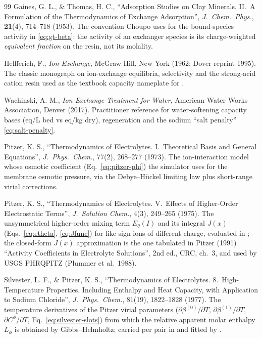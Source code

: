 \documentclass[11pt,a4paper]{article}
\begin{document}
\begin{thebibliography}{99}
 Gaines, G. L., \& Thomas, H. C., ``Adsorption Studies on Clay Minerals. II.\ A Formulation of the Thermodynamics of Exchange Adsorption'', \emph{J.\ Chem.\ Phys.}, \textbf{21}(4), 714--718 (1953). The convention Choupo uses for the bound-species activity in \eqref{eq:gt-beta}: the activity of an exchanger species is its charge-weighted \emph{equivalent fraction} on the resin, not its molality.

 Helfferich, F., \emph{Ion Exchange}, McGraw-Hill, New York (1962; Dover reprint 1995). The classic monograph on ion-exchange equilibria, selectivity and the strong-acid cation resin used as the textbook capacity nameplate for .

 Wachinski, A. M., \emph{Ion Exchange Treatment for Water}, American Water Works Association, Denver (2017). Practitioner reference for water-softening capacity bases (eq/L bed vs eq/kg dry), regeneration and the sodium ``salt penalty'' \eqref{eq:salt-penalty}.

 Pitzer, K. S., ``Thermodynamics of Electrolytes.
I.\ Theoretical Basis and General Equations'', \emph{J.\ Phys.\ Chem.},
77(2), 268--277 (1973). The ion-interaction model whose osmotic
coefficient (Eq.~\ref{eq:pitzer-phi}) the simulator uses for the
membrane osmotic pressure, via the Debye--H\"uckel limiting law plus
short-range virial corrections.

 Pitzer, K. S., ``Thermodynamics of Electrolytes.
V.\ Effects of Higher-Order Electrostatic Terms'', \emph{J.\ Solution
Chem.}, 4(3), 249--265 (1975). The unsymmetrical higher-order mixing
term $E_\theta(I)$ and its integral $J(x)$ (Eqs.~\ref{eq:etheta},
\ref{eq:Jfunc}) for like-sign ions of different charge, evaluated in
; the closed-form $J(x)$ approximation is the
one tabulated in Pitzer (1991) ``Activity Coefficients in Electrolyte
Solutions'', 2nd ed., CRC, ch.~3, and used by USGS PHRQPITZ (Plummer et
al.\ 1988).

 Silvester, L. F., \& Pitzer, K. S.,
``Thermodynamics of Electrolytes. 8.\ High-Temperature Properties,
Including Enthalpy and Heat Capacity, with Application to Sodium
Chloride'', \emph{J.\ Phys.\ Chem.}, 81(19), 1822--1828 (1977). The
temperature derivatives of the Pitzer virial parameters
($\partial\beta^{(0)}/\partial T$, $\partial\beta^{(1)}/\partial T$,
$\partial C^\phi/\partial T$, Eq.~\ref{eq:silvester-slots}) from which
the relative apparent molar enthalpy $L_\phi$ is obtained by
Gibbs--Helmholtz; carried per pair in  and fitted by
.


\end{thebibliography}
\end{document}
